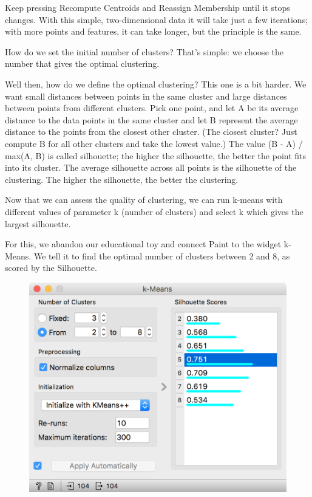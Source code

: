 Keep pressing Recompute Centroids and Reassign Membership until it stops changes. With this simple, two-dimensional data it will take just a few iterations; with more points and features, it can take longer, but the principle is the same.

How do we set the initial number of clusters? That's simple: we choose the number that gives the optimal clustering.

Well then, how do we define the optimal clustering? This one is a bit harder. We want small distances between points in the same cluster and large distances between points from different clusters. Pick one point, and let A be its average distance to the data points in the same cluster and let B represent the average distance to the points from the closest other cluster. (The closest cluster? Just compute B for all other clusters and take the lowest value.) The value (B - A) / max(A, B) is called silhouette; the higher the silhouette, the better the point fits into its cluster. The average silhouette across all points is the silhouette of the clustering. The higher the silhouette, the better the clustering.

Now that we can assess the quality of clustering, we can run k-means with different values of parameter k (number of clusters) and select k which gives the largest silhouette.

For this, we abandon our educational toy and connect Paint to the widget k-Means. We tell it to find the optimal number of clusters between 2 and 8, as scored by the Silhouette.

\begin{figure}[h]
    \centering
    \includegraphics[width=\linewidth]{kmeans-silhouette.png}
    \caption{$\;$} %
\end{figure}


